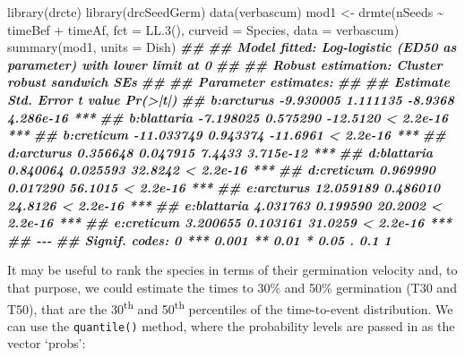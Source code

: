 \documentclass[
]{book}
\newenvironment{Shaded}{\begin{snugshade}}{\end{snugshade}}
\newcommand{\AttributeTok}[1]{\textcolor[rgb]{0.77,0.63,0.00}{#1}}
\newcommand{\DocumentationTok}[1]{\textcolor[rgb]{0.56,0.35,0.01}{\textbf{\textit{#1}}}}
\newcommand{\FunctionTok}[1]{\textcolor[rgb]{0.00,0.00,0.00}{#1}}
\newcommand{\NormalTok}[1]{#1}
\newcommand{\OtherTok}[1]{\textcolor[rgb]{0.56,0.35,0.01}{#1}}
\newcommand{\SpecialCharTok}[1]{\textcolor[rgb]{0.00,0.00,0.00}{#1}}
\begin{document}
\begin{Shaded}
\begin{Highlighting}[]
\FunctionTok{library}\NormalTok{(drcte)}
\FunctionTok{library}\NormalTok{(drcSeedGerm)}
\FunctionTok{data}\NormalTok{(verbascum)}
\NormalTok{mod1 }\OtherTok{\textless{}{-}} \FunctionTok{drmte}\NormalTok{(nSeeds }\SpecialCharTok{\textasciitilde{}}\NormalTok{ timeBef }\SpecialCharTok{+}\NormalTok{ timeAf, }\AttributeTok{fct =} \FunctionTok{LL.3}\NormalTok{(),}
             \AttributeTok{curveid =}\NormalTok{ Species, }\AttributeTok{data =}\NormalTok{ verbascum)}
\FunctionTok{summary}\NormalTok{(mod1, }\AttributeTok{units =}\NormalTok{ Dish)}
\DocumentationTok{\#\# }
\DocumentationTok{\#\# Model fitted: Log{-}logistic (ED50 as parameter) with lower limit at 0}
\DocumentationTok{\#\# }
\DocumentationTok{\#\# Robust estimation: Cluster robust sandwich SEs }
\DocumentationTok{\#\# }
\DocumentationTok{\#\# Parameter estimates:}
\DocumentationTok{\#\# }
\DocumentationTok{\#\#               Estimate Std. Error  t value  Pr(\textgreater{}|t|)    }
\DocumentationTok{\#\# b:arcturus   {-}9.930005   1.111135  {-}8.9368 4.286e{-}16 ***}
\DocumentationTok{\#\# b:blattaria  {-}7.198025   0.575290 {-}12.5120 \textless{} 2.2e{-}16 ***}
\DocumentationTok{\#\# b:creticum  {-}11.033749   0.943374 {-}11.6961 \textless{} 2.2e{-}16 ***}
\DocumentationTok{\#\# d:arcturus    0.356648   0.047915   7.4433 3.715e{-}12 ***}
\DocumentationTok{\#\# d:blattaria   0.840064   0.025593  32.8242 \textless{} 2.2e{-}16 ***}
\DocumentationTok{\#\# d:creticum    0.969990   0.017290  56.1015 \textless{} 2.2e{-}16 ***}
\DocumentationTok{\#\# e:arcturus   12.059189   0.486010  24.8126 \textless{} 2.2e{-}16 ***}
\DocumentationTok{\#\# e:blattaria   4.031763   0.199590  20.2002 \textless{} 2.2e{-}16 ***}
\DocumentationTok{\#\# e:creticum    3.200655   0.103161  31.0259 \textless{} 2.2e{-}16 ***}
\DocumentationTok{\#\# {-}{-}{-}}
\DocumentationTok{\#\# Signif. codes:  0 \textquotesingle{}***\textquotesingle{} 0.001 \textquotesingle{}**\textquotesingle{} 0.01 \textquotesingle{}*\textquotesingle{} 0.05 \textquotesingle{}.\textquotesingle{} 0.1 \textquotesingle{} \textquotesingle{} 1}
\end{Highlighting}
\end{Shaded}

It may be useful to rank the species in terms of their germination velocity and, to that purpose, we could estimate the times to 30\% and 50\% germination (T30 and T50), that are the 30\textsuperscript{th} and 50\textsuperscript{th} percentiles of the time-to-event distribution. We can use the \texttt{quantile()} method, where the probability levels are passed in as the vector `probs':
\end{document}
